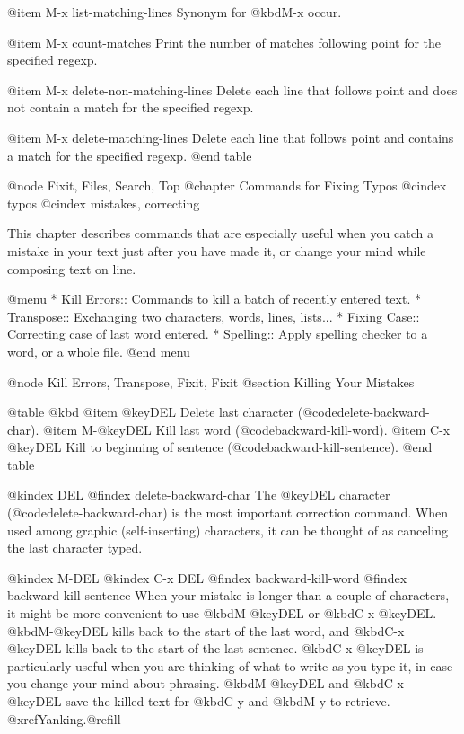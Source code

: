 {{{{{{{{{{{{{{{{@item M-x list-matching-lines
Synonym for @kbd{M-x occur}.

@item M-x count-matches
Print the number of matches following point for the specified regexp.

@item M-x delete-non-matching-lines
Delete each line that follows point and does not contain a match for
the specified regexp.

@item M-x delete-matching-lines
Delete each line that follows point and contains a match for the
specified regexp.
@end table

@node Fixit, Files, Search, Top
@chapter Commands for Fixing Typos
@cindex typos
@cindex mistakes, correcting

  This chapter describes commands that are especially useful when you
catch a mistake in your text just after you have made it, or change your
mind while composing text on line.

@menu
* Kill Errors:: Commands to kill a batch of recently entered text.
* Transpose::   Exchanging two characters, words, lines, lists...
* Fixing Case:: Correcting case of last word entered.
* Spelling::    Apply spelling checker to a word, or a whole file.
@end menu

@node Kill Errors, Transpose, Fixit, Fixit
@section Killing Your Mistakes

@table @kbd
@item @key{DEL}
Delete last character (@code{delete-backward-char}).
@item M-@key{DEL}
Kill last word (@code{backward-kill-word}).
@item C-x @key{DEL}
Kill to beginning of sentence (@code{backward-kill-sentence}).
@end table

@kindex DEL
@findex delete-backward-char
  The @key{DEL} character (@code{delete-backward-char}) is the most
important correction command.  When used among graphic (self-inserting)
characters, it can be thought of as canceling the last character typed.

@kindex M-DEL
@kindex C-x DEL
@findex backward-kill-word
@findex backward-kill-sentence
  When your mistake is longer than a couple of characters, it might be more
convenient to use @kbd{M-@key{DEL}} or @kbd{C-x @key{DEL}}.
@kbd{M-@key{DEL}} kills back to the start of the last word, and @kbd{C-x
@key{DEL}} kills back to the start of the last sentence.  @kbd{C-x
@key{DEL}} is particularly useful when you are thinking of what to write as
you type it, in case you change your mind about phrasing.
@kbd{M-@key{DEL}} and @kbd{C-x @key{DEL}} save the killed text for
@kbd{C-y} and @kbd{M-y} to retrieve.  @xref{Yanking}.@refill

}}}}}}}}}}}}}}}}
